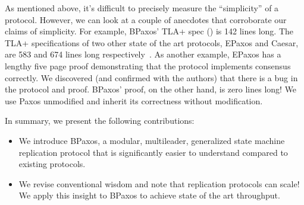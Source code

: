 As mentioned above, it's difficult to precisely measure the ``simplicity'' of a
protocol. However, we can look at a couple of anecdotes that corroborate our
claims of simplicity. For example, BPaxos' TLA+ spec () is 142
lines long. The TLA+ specifications of two other state of the art protocols,
EPaxos and Caesar, are 583 and 674 lines long
respectively~\cite{moraru2013there, arun2017speeding}.
%
%
As another example, EPaxos has a lengthy five page proof demonstrating that the
protocol implements consensus correctly. We discovered (and confirmed with the
authors) that there is a bug in the protocol and proof. BPaxos' proof, on the
other hand, is zero lines long! We use Paxos unmodified and inherit its
correctness without modification.

In summary, we present the following contributions:
\begin{itemize}
  \item
    We introduce BPaxos, a modular, multileader, generalized state machine
    replication protocol that is significantly easier to understand compared to
    existing protocols.
  \item
    We revise conventional wisdom and note that replication protocols can
    scale! We apply this insight to BPaxos to achieve state of the art
    throughput.
\end{itemize}
